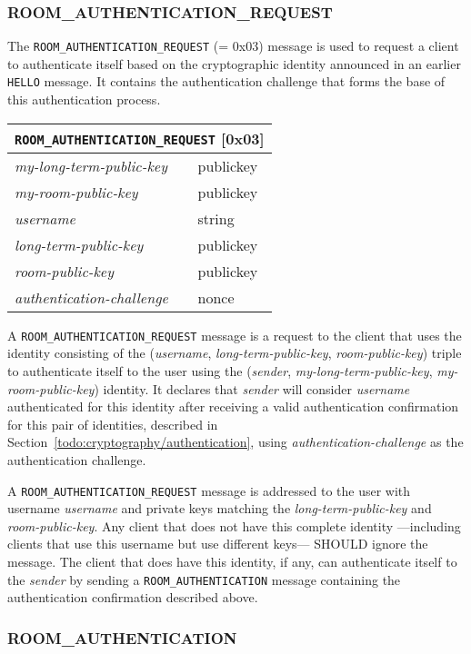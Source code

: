 \documentclass{article}
\def\message#1{\texttt{#1}}
\def\field#1{\textit{#1}}
\newenvironment{basicmessage}[2]{
\newcommand{\messagefield}[2]{
\field{##1} & \textsf{##2} \\
\hline
}
\begin{tabular}{|l|l|}
\hline
\multicolumn{2}{|c|}{\message{#1} [#2]} \\
\hline
\hline
}{
\end{tabular}
}
\begin{document}
\subsubsection{ROOM\_AUTHENTICATION\_REQUEST}
\label{sec:messages/room-authentication-request}

The \message{ROOM\_AUTHENTICATION\_REQUEST} (= 0x03) message is used to request a client to authenticate itself based on the cryptographic identity announced in an earlier \message{HELLO} message.
It contains the authentication challenge that forms the base of this authentication process.

\begin{basicmessage}{ROOM\_AUTHENTICATION\_REQUEST}{0x03}
\messagefield{my-long-term-public-key}{publickey}
\messagefield{my-room-public-key}{publickey}
\messagefield{username}{string}
\messagefield{long-term-public-key}{publickey}
\messagefield{room-public-key}{publickey}
\messagefield{authentication-challenge}{nonce}
\end{basicmessage}

A \message{ROOM\_AUTHENTICATION\_REQUEST} message is a request to the client that uses the identity consisting of the (\field{username}, \field{long-term-public-key}, \field{room-public-key}) triple to authenticate itself to the user using the (\field{sender}, \field{my-long-term-public-key}, \field{my-room-public-key}) identity.
It declares that \field{sender} will consider \field{username} authenticated for this identity after receiving a valid authentication confirmation for this pair of identities, described in Section~\ref{todo:cryptography/authentication}, using \field{authentication-challenge} as the authentication challenge.

A \message{ROOM\_AUTHENTICATION\_REQUEST} message is addressed to the user with username \field{username} and private keys matching the \field{long-term-public-key} and \field{room-public-key}.
Any client that does not have this complete identity ---including clients that use this username but use different keys--- SHOULD ignore the message.
The client that does have this identity, if any, can authenticate itself to the \field{sender} by sending a \message{ROOM\_AUTHENTICATION} message containing the authentication confirmation described above.


\subsubsection{ROOM\_AUTHENTICATION}
\label{sec:messages/room-authentication}
\end{document}
